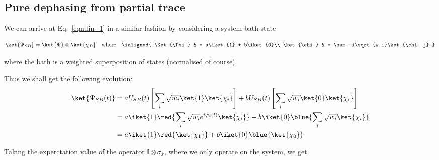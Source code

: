  \subsection{Pure dephasing from partial trace\label{sec:lin_2}}
 We can  arrive at  Eq.~\eqref{eqn:lin_1} in  a similar fashion  by considering  a system-bath
 state
   
   \begin{equation}\label{key}
     \ket{\Psi_{SB}} = \ket{\Psi} \otimes \ket{\chi_B} \quad\text{where}\quad 
     \ialigned{
       \Ket{\Psi} & = a\iket{1} + b\iket{0}\\
       \ket{\chi} & = \sum_i\sqrt{w_i}\ket{\chi_j}
     } 
   \end{equation}
  
   \noindent where the bath is a weighted superposition of  states (normalised of
   course).
  

   \noindent Thus we shall get the following evolution:
   \begin{equation}\label{key}
     \begin{aligned}
       \ket{\Psi_{SB}(t)} & = aU_{SB}(t)\left[\sum_i\sqrt{w_i}\ket{1}\ket{\chi_i}\right] + bU_{SB}(t)\left[\sum_i\sqrt{w_i}\ket{0}\ket{\chi_i}\right]\\
       & = a\iket{1}\red{\sum_i\sqrt{w_i}e^{i\varphi_i(t)}\ket{\chi_i}} + b\iket{0}\blue{\sum_i\sqrt{w_i}\ket{\chi_i}}\\
       & = a\iket{1}\red{\ket{\chi_1}} + b\iket{0}\blue{\ket{\chi_0}}
     \end{aligned}
   \end{equation}
   \vspace{1cm}
  
   \noindent Taking  the experctation value of  the operator $ \mathbb{I}  \otimes \sigma_x $,
   where we only operate on the system, we get
  
